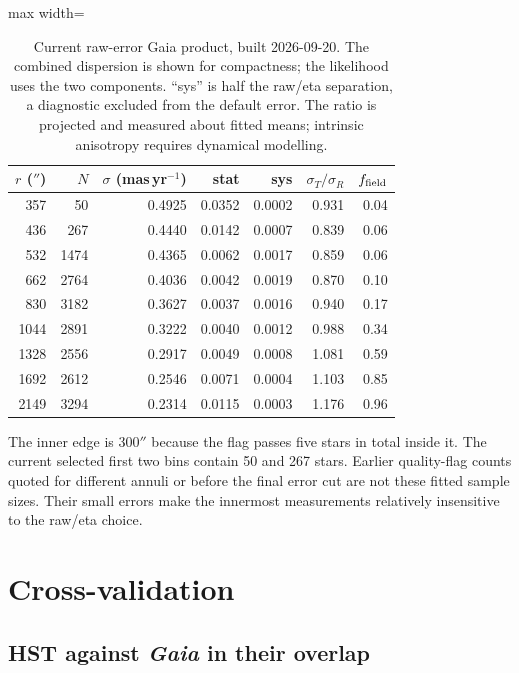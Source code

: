 \documentclass[11pt,a4paper]{article}
\newcommand{\masyr}{mas\,yr$^{-1}$}
\begin{document}
\begin{table}[h]
\centering\small
\begin{adjustbox}{max width=\linewidth}
\begin{tabular}{rrrrrrr}
\toprule
$r$ ($''$) & $N$ & $\sigma$ (\masyr) & stat & sys & $\sigma_T/\sigma_R$ & $f_{\rm field}$ \\
\midrule
357 & 50 & 0.4925 & 0.0352 & 0.0002 & 0.931 & 0.04 \\
436 & 267 & 0.4440 & 0.0142 & 0.0007 & 0.839 & 0.06 \\
532 & 1474 & 0.4365 & 0.0062 & 0.0017 & 0.859 & 0.06 \\
662 & 2764 & 0.4036 & 0.0042 & 0.0019 & 0.870 & 0.10 \\
830 & 3182 & 0.3627 & 0.0037 & 0.0016 & 0.940 & 0.17 \\
1044 & 2891 & 0.3222 & 0.0040 & 0.0012 & 0.988 & 0.34 \\
1328 & 2556 & 0.2917 & 0.0049 & 0.0008 & 1.081 & 0.59 \\
1692 & 2612 & 0.2546 & 0.0071 & 0.0004 & 1.103 & 0.85 \\
2149 & 3294 & 0.2314 & 0.0115 & 0.0003 & 1.176 & 0.96 \\
\bottomrule
\end{tabular}
\end{adjustbox}
\caption{Current raw-error Gaia product, built 2026-09-20. The combined dispersion is
shown for compactness; the likelihood uses the two components. ``sys'' is half the
raw/eta separation, a diagnostic excluded from the default error. The ratio is projected
and measured about fitted means; intrinsic anisotropy requires dynamical modelling.}
\end{table}

The inner edge is $300''$ because the flag passes five stars in total inside it. The current selected first two bins contain 50 and 267 stars. Earlier quality-flag
counts quoted for different annuli or before the final error cut are not these fitted
sample sizes. Their small errors make the innermost measurements relatively insensitive
to the raw/eta choice.

\section{Cross-validation}

\subsection{HST against \emph{Gaia} in their overlap}
\end{document}

